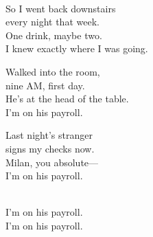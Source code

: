 \begin{lyrics}
\\
So I went back downstairs\\
every night that week.\\
One drink, maybe two.\\
I knew exactly where I was going.

Walked into the room,\\
nine AM, first day.\\
He's at the head of the table.\\
I'm on his payroll.

Last night's stranger\\
signs my checks now.\\
Milan, you absolute—\\
I'm on his payroll.

\\
I'm on his payroll.\\
I'm on his payroll.

\end{lyrics}

